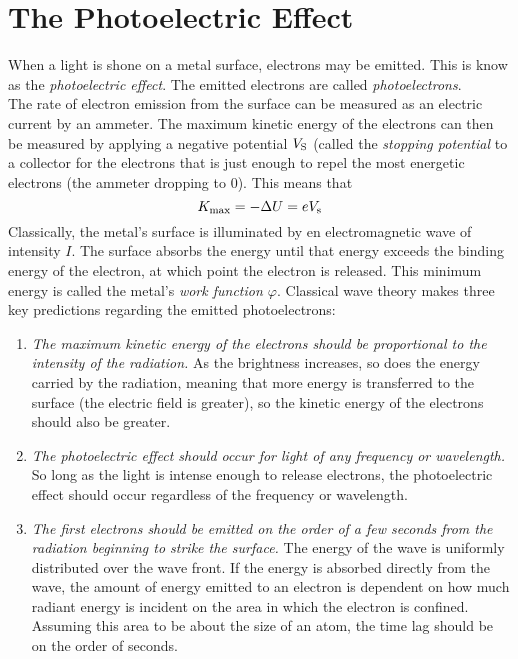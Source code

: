 \documentclass{subfiles}
\begin{document}
	\section{The Photoelectric Effect}
		When a light is shone on a metal surface, electrons may be emitted. This is know as the \textit{photoelectric effect}. The emitted electrons are called \textit{photoelectrons}. \\
			The rate of electron emission from the surface can be measured as an electric current by an ammeter. The maximum kinetic energy of the electrons can then be measured by applying a negative potential \(V_{\text{S}}\) (called the \textit{stopping potential} to a collector for the electrons that is just enough to repel the most energetic electrons (the ammeter dropping to 0). This means that
			\[
				K_{\text{max}} = -\Delta U
					= eV_{\text{s}}
			\]
			Classically, the metal's surface is illuminated by en electromagnetic wave of intensity \(I\). The surface absorbs the energy until that energy exceeds the binding energy of the electron, at which point the electron is released. This minimum energy is called the metal's \textit{work function \(\varphi\)}.
			Classical wave theory makes three key predictions regarding the emitted photoelectrons:
				\begin{enumerate}
					\item \textit{The maximum kinetic energy of the electrons should be proportional to the intensity of the radiation.}
						As the brightness increases, so does the energy carried by the radiation, meaning that more energy is transferred to the surface (the electric field is greater), so the kinetic energy of the electrons should also be greater.
					\item \textit{The photoelectric effect should occur	for light of any frequency or wavelength.}
						So long as the light is intense enough to release electrons, the photoelectric effect should occur regardless of the frequency or wavelength.
					\item \textit{The first electrons should be emitted on the order of a few seconds from the radiation beginning to strike the surface.}
						The energy of the wave is uniformly distributed over the wave front. If the energy is absorbed directly from the wave, the amount of energy emitted to an electron is dependent on how much radiant energy is incident on the area in which the electron is confined. Assuming this area to be about the size of an atom, the time lag should be on the order of seconds.
				\end{enumerate}
\end{document}
